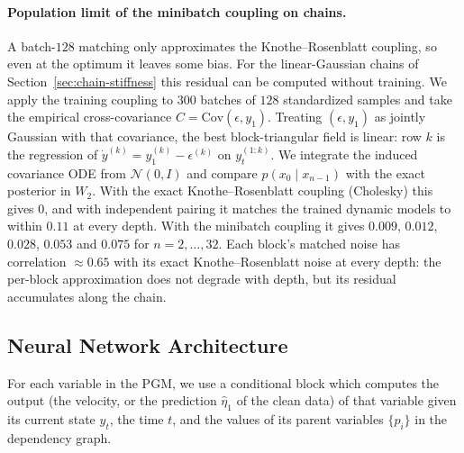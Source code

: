 {\paragraph{Population limit of the minibatch coupling on chains.} A batch-$128$ matching only approximates the Knothe--Rosenblatt coupling, so even at the optimum it leaves some bias. For the linear-Gaussian chains of Section~\ref{sec:chain-stiffness} this residual can be computed without training. We apply the training coupling to $300$ batches of $128$ standardized samples and take the empirical cross-covariance $C = \mathrm{Cov}(\epsilon, y_1)$. Treating $(\epsilon, y_1)$ as jointly Gaussian with that covariance, the best block-triangular field is linear: row $k$ is the regression of $\dot y^{(k)} = y_1^{(k)} - \epsilon^{(k)}$ on $y_t^{(1:k)}$. We integrate the induced covariance ODE from $\mathcal{N}(0, I)$ and compare $p(x_0 \mid x_{n-1})$ with the exact posterior in $W_2$. With the exact Knothe--Rosenblatt coupling (Cholesky) this gives $0$, and with independent pairing it matches the trained dynamic models to within $0.11$ at every depth. With the minibatch coupling it gives $0.009$, $0.012$, $0.028$, $0.053$ and $0.075$ for $n = 2, \dots, 32$. Each block's matched noise has correlation ${\approx}0.65$ with its exact Knothe--Rosenblatt noise at every depth: the per-block approximation does not degrade with depth, but its residual accumulates along the chain.}

\subsection{Neural Network Architecture}

For each variable in the PGM, we use a conditional block which computes the output (the velocity, or the prediction $\hat\eta_1$ of the clean data) of that variable given its current state $y_t$, the time $t$, and the values of its parent variables $\{p_i\}$ in the dependency graph.

